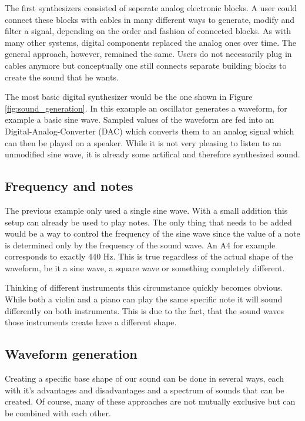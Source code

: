 		The first synthesizers consisted of seperate analog electronic blocks.
		A user could connect these blocks with cables in many different ways to generate, modify and filter a signal, depending on the order and fashion of connected blocks.
		As with many other systems, digital components replaced the analog ones over time.
		The general approach, however, remained the same. 
		Users do not necessarily plug in cables anymore but conceptually one still connects separate building blocks to create the sound that he wants.
		
		The most basic digital synthesizer would be the one shown in Figure \ref{fig:sound_generation}. 
		In this example an oscillator generates a waveform, for example a basic sine wave.
		Sampled values of the waveform are fed into an Digital-Analog-Converter (DAC) which converts them to an analog signal which can then be played on a speaker.
		While it is not very pleasing to listen to an unmodified sine wave, it is already some artifical and therefore synthesized sound.
		
		\subsection{Frequency and notes}
		The previous example only used a single sine wave. 
		With a small addition this setup can already be used to play notes.
		The only thing that needs to be added would be a way to control the frequency of the sine wave since the value of a note is determined only by the frequency of the sound wave. 
		An A4 for example corresponds to exactly 440 Hz.
		This is true regardless of the actual shape of the waveform, be it a sine wave, a square wave or something completely different. 

		Thinking of different instruments this circumstance quickly becomes obvious. 
		While both a violin and a piano can play the same specific note it will sound differently on both instruments.
		This is due to the fact, that the sound waves those instruments create have a different shape.
		
		\subsection{Waveform generation}
		Creating a specific base shape of our sound can be done in several ways, each with it's advantages and disadvantages and a spectrum of sounds that can be created.
		Of course, many of these approaches are not mutually exclusive but can be combined with each other.
